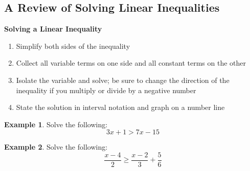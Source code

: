 \documentclass[addpoints,12pt]{exam}
\newcommand{\topic}{A Review of Solving Linear Inequalities}
\theoremstyle{definition}
\newtheorem{example}{Example}[subsection]
\begin{document}
\setcounter{section}{9}
\setcounter{subsection}{0}

\subsection{\topic}

\begin{mdframed}
\textbf{Solving a Linear Inequality}
\begin{enumerate}
\item Simplify both sides of the inequality
\item Collect all variable terms on one side and all constant terms on the other
\item Isolate the variable and solve; be sure to change the direction of the inequality if you multiply or divide by a negative number
\item State the solution in interval notation and graph on a number line
\end{enumerate}
\end{mdframed}

\vspace{.2in}

\begin{example}
Solve the following: \[3x + 1 > 7x - 15\]
\vspace{1.5in}
\end{example}

\begin{example}
Solve the following: \[\dfrac{x-4}{2} \ge \dfrac{x-2}{3}+\dfrac{5}{6}\]
\vspace{2in}
\end{example}
\end{document}
